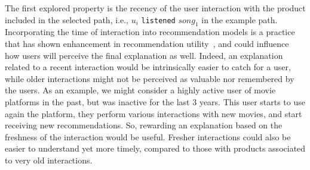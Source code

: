 \documentclass[sigconf]{acmart}
\begin{document}
\vspace{1mm}  
The first explored property is the recency of the user interaction with the product included in the selected path, i.e., $u_i$ \texttt{listened} $song_1$ in the example path. 
Incorporating the time of interaction into recommendation models is a practice that has shown enhancement in recommendation utility~\cite{LeePP08,DingLO06}, and could influence how users will perceive the final explanation as well.
Indeed, an explanation related to a recent interaction would be intrinsically easier to catch for a user, while older interactions might not be perceived as valuable nor remembered by the users.
As an example, we might consider a highly active user of movie platforms in the past, but was inactive for the last 3 years. 
This user starts to use again the platform, they perform various interactions with new movies, and start receiving new recommendations. 
So, rewarding an explanation based on the freshness of the interaction would be useful. 
Fresher interactions could also be easier to understand yet more timely, compared to those with products associated to very old interactions.
\end{document}

